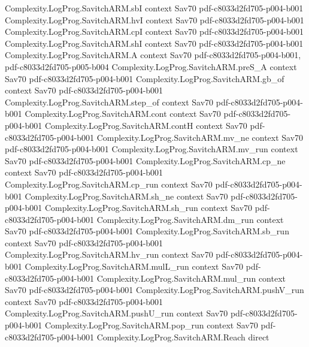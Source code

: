 \begin{theorem}
\proofstep
  {Complexity.LogProg.SavitchARM.sbI}
  {context}
  {Sav70}
  {pdf-c8033d2fd705-p004-b001}
\proofstep
  {Complexity.LogProg.SavitchARM.hvI}
  {context}
  {Sav70}
  {pdf-c8033d2fd705-p004-b001}
\proofstep
  {Complexity.LogProg.SavitchARM.cpI}
  {context}
  {Sav70}
  {pdf-c8033d2fd705-p004-b001}
\proofstep
  {Complexity.LogProg.SavitchARM.shI}
  {context}
  {Sav70}
  {pdf-c8033d2fd705-p004-b001}
\proofstep
  {Complexity.LogProg.SavitchARM.A}
  {context}
  {Sav70}
  {pdf-c8033d2fd705-p004-b001,
    pdf-c8033d2fd705-p005-b004}
\proofstep
  {Complexity.LogProg.SavitchARM.preS_A}
  {context}
  {Sav70}
  {pdf-c8033d2fd705-p004-b001}
\proofstep
  {Complexity.LogProg.SavitchARM.gb_of}
  {context}
  {Sav70}
  {pdf-c8033d2fd705-p004-b001}
\proofstep
  {Complexity.LogProg.SavitchARM.step_of}
  {context}
  {Sav70}
  {pdf-c8033d2fd705-p004-b001}
\proofstep
  {Complexity.LogProg.SavitchARM.cont}
  {context}
  {Sav70}
  {pdf-c8033d2fd705-p004-b001}
\proofstep
  {Complexity.LogProg.SavitchARM.contH}
  {context}
  {Sav70}
  {pdf-c8033d2fd705-p004-b001}
\proofstep
  {Complexity.LogProg.SavitchARM.mv_ne}
  {context}
  {Sav70}
  {pdf-c8033d2fd705-p004-b001}
\proofstep
  {Complexity.LogProg.SavitchARM.mv_run}
  {context}
  {Sav70}
  {pdf-c8033d2fd705-p004-b001}
\proofstep
  {Complexity.LogProg.SavitchARM.cp_ne}
  {context}
  {Sav70}
  {pdf-c8033d2fd705-p004-b001}
\proofstep
  {Complexity.LogProg.SavitchARM.cp_run}
  {context}
  {Sav70}
  {pdf-c8033d2fd705-p004-b001}
\proofstep
  {Complexity.LogProg.SavitchARM.sh_ne}
  {context}
  {Sav70}
  {pdf-c8033d2fd705-p004-b001}
\proofstep
  {Complexity.LogProg.SavitchARM.sh_run}
  {context}
  {Sav70}
  {pdf-c8033d2fd705-p004-b001}
\proofstep
  {Complexity.LogProg.SavitchARM.dm_run}
  {context}
  {Sav70}
  {pdf-c8033d2fd705-p004-b001}
\proofstep
  {Complexity.LogProg.SavitchARM.sb_run}
  {context}
  {Sav70}
  {pdf-c8033d2fd705-p004-b001}
\proofstep
  {Complexity.LogProg.SavitchARM.hv_run}
  {context}
  {Sav70}
  {pdf-c8033d2fd705-p004-b001}
\proofstep
  {Complexity.LogProg.SavitchARM.mulL_run}
  {context}
  {Sav70}
  {pdf-c8033d2fd705-p004-b001}
\proofstep
  {Complexity.LogProg.SavitchARM.mul_run}
  {context}
  {Sav70}
  {pdf-c8033d2fd705-p004-b001}
\proofstep
  {Complexity.LogProg.SavitchARM.pushV_run}
  {context}
  {Sav70}
  {pdf-c8033d2fd705-p004-b001}
\proofstep
  {Complexity.LogProg.SavitchARM.pushU_run}
  {context}
  {Sav70}
  {pdf-c8033d2fd705-p004-b001}
\proofstep
  {Complexity.LogProg.SavitchARM.pop_run}
  {context}
  {Sav70}
  {pdf-c8033d2fd705-p004-b001}
\proofstep
  {Complexity.LogProg.SavitchARM.Reach}
  {direct}

\end{theorem}
